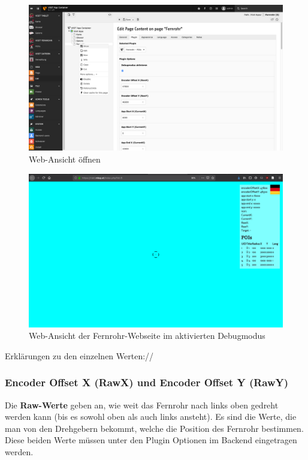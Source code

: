 \begin{figure}[ht!]
\centering
\includegraphics[width=12cm]{Figures/paula/fernrohr/einrichtung_fernrohr/fernrohr_web_ansicht.png}
\caption{Web-Ansicht öffnen}
\label{img:fernrohr_webansicht_oeffnen}
\end{figure}

\begin{figure}[ht!]
\centering
\includegraphics[width=12cm]{Figures/paula/fernrohr/einrichtung_fernrohr/fernrohr_web_ansicht1.png}
\caption{Web-Ansicht der Fernrohr-Webseite im aktivierten Debugmodus}
\label{img:fernrohr_webansicht_debugmodus}
\end{figure}



Erklärungen zu den einzelnen Werten://

\subsubsection{Encoder Offset X (RawX) und Encoder Offset Y (RawY)}

Die \textbf{Raw-Werte} geben an, wie weit das Fernrohr nach links oben gedreht werden kann (bis es sowohl oben als auch links ansteht). Es sind die Werte, die man von den Drehgebern bekommt, welche die Position des Fernrohr bestimmen. Diese beiden Werte müssen unter den Plugin Optionen im Backend eingetragen werden.\\

